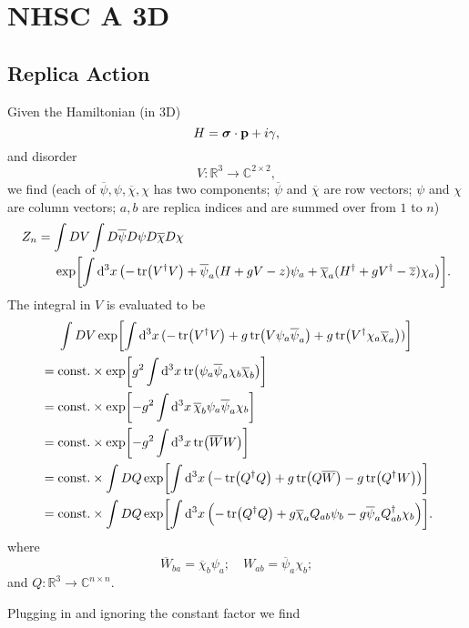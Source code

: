 \documentclass{article}
\begin{document}
\section{NHSC A 3D}

\subsection{Replica Action}

Given the Hamiltonian (in 3D)
\[ H = \vb*{\sigma} \cdot \vb{p} + i \gamma, \]
and disorder
\[ V: \mathbb{R}^3 \rightarrow \mathbb{C}^{2\times 2}, \]
we find (each of $\overline{\psi},\psi,\overline{\chi},\chi$ has two components; $\overline{\psi}$ and $\overline{\chi}$ are row vectors; $\psi$ and $\chi$ are column vectors; $a,b$ are replica indices and are summed over from $1$ to $n$)
\begin{align*}
    Z_n &= \int DV \int D{\overline{\psi}}D{{\psi}}D{\overline{\chi}}D{{\chi}} \\
    &\phantom{{}={}} \exp[\int \dd[3]{x}\qty(-\tr(V^\dagger V) + \overline{\psi}_a(H + gV - z)\psi_a + \overline{\chi}_a(H^\dagger + gV^\dagger - \overline{z})\chi_a)].
\end{align*}
The integral in $V$ is evaluated to be
\begin{align*}
    &\phantom{{}={}} \int DV \exp[\int \dd[3]{x} (-\tr(V^\dagger V) + g\tr(V \psi_a \overline{\psi}_a) + g\tr(V^\dagger \chi_a \overline{\chi}_a))] \\
    &= \text{const.} \times \exp[g^2 \int \dd[3]{x} \tr(\psi_a \overline{\psi}_a \chi_b \overline{\chi}_b)] \\
    &= \text{const.} \times \exp[-g^2 \int \dd[3]{x} \overline{\chi}_b \psi_a \overline{\psi}_a \chi_b ] \\
    &= \text{const.} \times \exp[-g^2 \int \dd[3]{x} \tr(\overline{W}W) ] \\
    &= \text{const.} \times \int DQ \exp[\int \dd[3]{x} \qty(-\tr(Q^\dagger Q) + g \tr(Q\overline{W}) - g\tr(Q^\dagger W)) ] \\
    &= \text{const.} \times \int DQ \exp[\int \dd[3]{x} \qty(-\tr(Q^\dagger Q) + g \overline{\chi}_a Q_{ab} \psi_b - g\overline{\psi}_a Q^\dagger_{ab}\chi_b) ].
\end{align*}
where
\[ \overline{W}_{ba} = \overline{\chi}_b \psi_a;\quad W_{ab} = \overline{\psi}_a \chi_b; \]
and $Q: \mathbb{R}^3 \rightarrow \mathbb{C}^{n\times n}$.
\par
Plugging in and ignoring the constant factor we find
\end{document}
